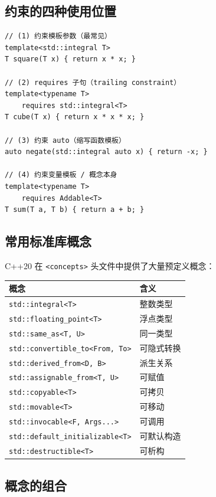\documentclass[12pt,a4paper,fontset=fandol]{ctexbook}
\begin{document}
\subsection{约束的四种使用位置}

\begin{lstlisting}
// (1) 约束模板参数（最常见）
template<std::integral T>
T square(T x) { return x * x; }

// (2) requires 子句（trailing constraint）
template<typename T>
    requires std::integral<T>
T cube(T x) { return x * x * x; }

// (3) 约束 auto（缩写函数模板）
auto negate(std::integral auto x) { return -x; }

// (4) 约束变量模板 / 概念本身
template<typename T>
    requires Addable<T>
T sum(T a, T b) { return a + b; }
\end{lstlisting}

\subsection{常用标准库概念}

C++20 在 \texttt{<concepts>} 头文件中提供了大量预定义概念：

\begin{center}
\begin{tabular}{ll}
\toprule
\textbf{概念} & \textbf{含义} \\
\midrule
\texttt{std::integral<T>} & 整数类型 \\
\texttt{std::floating\_point<T>} & 浮点类型 \\
\texttt{std::same\_as<T, U>} & 同一类型 \\
\texttt{std::convertible\_to<From, To>} & 可隐式转换 \\
\texttt{std::derived\_from<D, B>} & 派生关系 \\
\texttt{std::assignable\_from<T, U>} & 可赋值 \\
\texttt{std::copyable<T>} & 可拷贝 \\
\texttt{std::movable<T>} & 可移动 \\
\texttt{std::invocable<F, Args...>} & 可调用 \\
\texttt{std::default\_initializable<T>} & 可默认构造 \\
\texttt{std::destructible<T>} & 可析构 \\
\bottomrule
\end{tabular}
\end{center}

\subsection{概念的组合}
\end{document}

